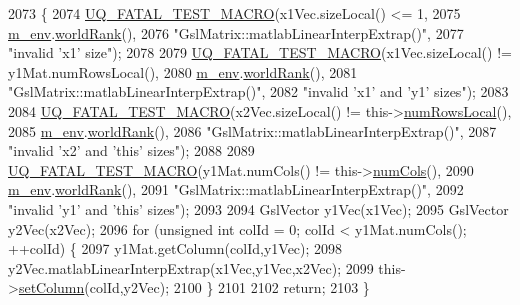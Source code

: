 \begin{DoxyCode}
2073 \{
2074   \hyperlink{_defines_8h_a56d63d18d0a6d45757de47fcc06f574d}{UQ\_FATAL\_TEST\_MACRO}(x1Vec.sizeLocal() <= 1,
2075                       \hyperlink{class_q_u_e_s_o_1_1_matrix_a247fb0fc0b87fecdee054bb4660b68e8}{m\_env}.\hyperlink{class_q_u_e_s_o_1_1_base_environment_a78b57112bbd0e6dd0e8afec00b40ffa7}{worldRank}(),
2076                       \textcolor{stringliteral}{"GslMatrix::matlabLinearInterpExtrap()"},
2077                       \textcolor{stringliteral}{"invalid 'x1' size"});
2078 
2079   \hyperlink{_defines_8h_a56d63d18d0a6d45757de47fcc06f574d}{UQ\_FATAL\_TEST\_MACRO}(x1Vec.sizeLocal() != y1Mat.numRowsLocal(),
2080                       \hyperlink{class_q_u_e_s_o_1_1_matrix_a247fb0fc0b87fecdee054bb4660b68e8}{m\_env}.\hyperlink{class_q_u_e_s_o_1_1_base_environment_a78b57112bbd0e6dd0e8afec00b40ffa7}{worldRank}(),
2081                       \textcolor{stringliteral}{"GslMatrix::matlabLinearInterpExtrap()"},
2082                       \textcolor{stringliteral}{"invalid 'x1' and 'y1' sizes"});
2083 
2084   \hyperlink{_defines_8h_a56d63d18d0a6d45757de47fcc06f574d}{UQ\_FATAL\_TEST\_MACRO}(x2Vec.sizeLocal() != this->\hyperlink{class_q_u_e_s_o_1_1_gsl_matrix_ab5ec937a9fd439eef1a87e12c0dbccb4}{numRowsLocal}(),
2085                       \hyperlink{class_q_u_e_s_o_1_1_matrix_a247fb0fc0b87fecdee054bb4660b68e8}{m\_env}.\hyperlink{class_q_u_e_s_o_1_1_base_environment_a78b57112bbd0e6dd0e8afec00b40ffa7}{worldRank}(),
2086                       \textcolor{stringliteral}{"GslMatrix::matlabLinearInterpExtrap()"},
2087                       \textcolor{stringliteral}{"invalid 'x2' and 'this' sizes"});
2088 
2089   \hyperlink{_defines_8h_a56d63d18d0a6d45757de47fcc06f574d}{UQ\_FATAL\_TEST\_MACRO}(y1Mat.numCols() != this->\hyperlink{class_q_u_e_s_o_1_1_gsl_matrix_ad5005f168fe030468e834776afb1859b}{numCols}(),
2090                       \hyperlink{class_q_u_e_s_o_1_1_matrix_a247fb0fc0b87fecdee054bb4660b68e8}{m\_env}.\hyperlink{class_q_u_e_s_o_1_1_base_environment_a78b57112bbd0e6dd0e8afec00b40ffa7}{worldRank}(),
2091                       \textcolor{stringliteral}{"GslMatrix::matlabLinearInterpExtrap()"},
2092                       \textcolor{stringliteral}{"invalid 'y1' and 'this' sizes"});
2093 
2094   GslVector y1Vec(x1Vec);
2095   GslVector y2Vec(x2Vec);
2096   \textcolor{keywordflow}{for} (\textcolor{keywordtype}{unsigned} \textcolor{keywordtype}{int} colId = 0; colId < y1Mat.numCols(); ++colId) \{
2097     y1Mat.getColumn(colId,y1Vec);
2098     y2Vec.matlabLinearInterpExtrap(x1Vec,y1Vec,x2Vec);
2099     this->\hyperlink{class_q_u_e_s_o_1_1_gsl_matrix_acec53efb5d0e70233a5acc326734493e}{setColumn}(colId,y2Vec);
2100   \}
2101 
2102   \textcolor{keywordflow}{return};
2103 \}
\end{DoxyCode}

